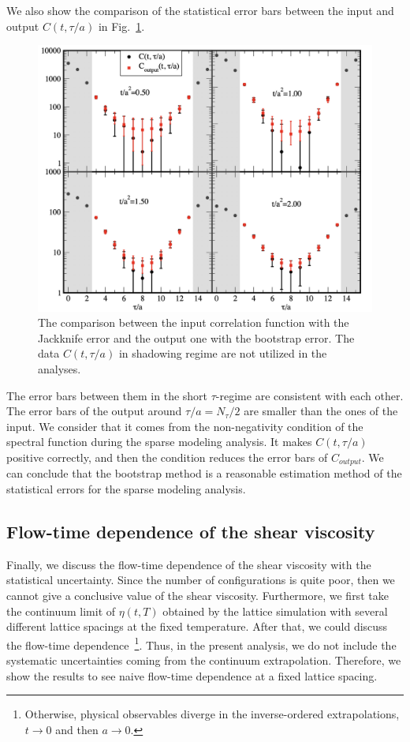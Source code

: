 \documentclass[a4paper,11pt]{article}
\begin{document}
We also show the comparison of the statistical error bars between the input and output $C(t,\tau/a)$ in Fig.~\ref{fig:input-output-Ctau}.
\begin{figure}[h]
\begin{center}
\includegraphics[scale=0.35]{./input-output-Ctau-boot-shadow.pdf}
\caption{The comparison between the input correlation function with the Jackknife error and the output one with the bootstrap error.  The data $C(t,\tau/a)$ in shadowing regime are not utilized in the analyses.}
\label{fig:input-output-Ctau}
\end{center}
\end{figure}
The error bars between them in the short $\tau$-regime are consistent with each other.
The error bars of the output around $\tau/a=N_\tau/2$ are smaller than the ones of the input.
We consider that it comes from the non-negativity condition of the spectral function during the sparse modeling analysis.
It makes $C(t,\tau/a)$ positive correctly, and then the condition reduces the error bars of $C_{output}$.
We can conclude that the bootstrap method is a reasonable estimation method of the statistical errors for the sparse modeling analysis.



\subsection{Flow-time dependence of the shear viscosity}
Finally, we discuss the flow-time dependence of the shear viscosity with the statistical uncertainty.
Since the number of configurations is quite poor, then we cannot give a conclusive value of the shear viscosity.
Furthermore, we first take the continuum limit of $\eta(t,T)$ obtained by the lattice simulation with several different lattice spacings at the fixed temperature. After that, we could discuss the flow-time dependence~\footnote{
Otherwise, physical observables diverge in the inverse-ordered extrapolations, $t\rightarrow 0$ and then $a \rightarrow 0$.}.
Thus, in the present analysis, we do not include the systematic uncertainties coming from the continuum extrapolation.
Therefore, we show the results to see naive flow-time dependence at a fixed lattice spacing.
\end{document}
